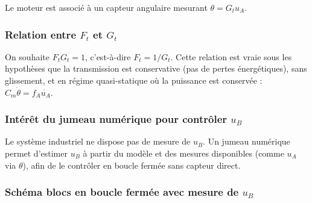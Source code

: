 \documentclass{rapportECL}
\begin{document}
Le moteur est associé à un capteur angulaire mesurant $\theta = G_t u_A$.

\subsubsection*{Relation entre $F_t$ et $G_t$}

On souhaite $F_t G_t = 1$, c'est-à-dire $F_t = 1/G_t$. Cette relation est vraie sous les hypothèses que la transmission est conservative (pas de pertes énergétiques), sans glissement, et en régime quasi-statique où la puissance est conservée : $C_m \dot{\theta} = f_A \dot{u_A}$.

\subsubsection*{Intérêt du jumeau numérique pour contrôler $u_B$}

Le système industriel ne dispose pas de mesure de $u_B$. Un jumeau numérique permet d'estimer $u_B$ à partir du modèle et des mesures disponibles (comme $u_A$ via $\theta$), afin de le contrôler en boucle fermée sans capteur direct.

\subsubsection*{Schéma blocs en boucle fermée avec mesure de $u_B$}
\end{document}
